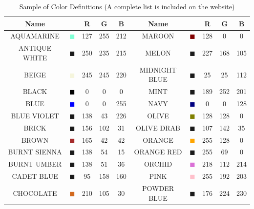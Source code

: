 \documentclass[11pt]{book}
\begin{document}
\begin{table}[p]
\begin{center}
\caption{Sample of Color Definitions (A complete list is included on the website) }
\label{tab:colors}
\vspace{0.1in}
\begin{tabular}{|c|c|c|c|c|c||c|c|c|c|}
\hline
Name & &  R  & G & B & Name & & R & G & B   \\ \hline \hline
{\ct AQUAMARINE} & \textcolor{AQUAMARINE} {$\blacksquare$} & 127& 255& 212& {\ct MAROON} &  \textcolor{MAROON} {$\blacksquare$} & 128& 0& 0  \\ \hline
{\ct ANTIQUE WHITE} & \textcolor{ANTIQUE WHITE} {$\blacksquare$} & 250& 235& 215& {\ct MELON} &  \textcolor{MELON} {$\blacksquare$} & 227& 168& 105  \\ \hline
{\ct BEIGE} & \textcolor{BEIGE} {$\blacksquare$} & 245& 245& 220& {\ct MIDNIGHT BLUE} &  \textcolor{MIDNIGHT BLUE} {$\blacksquare$} & 25& 25& 112  \\ \hline
{\ct BLACK} & \textcolor{BLACK} {$\blacksquare$} & 0& 0& 0& {\ct MINT} &  \textcolor{MINT} {$\blacksquare$} & 189& 252& 201  \\ \hline
{\ct BLUE} & \textcolor{BLUE} {$\blacksquare$} & 0& 0& 255& {\ct NAVY} &  \textcolor{NAVY} {$\blacksquare$} & 0& 0& 128  \\ \hline
{\ct BLUE VIOLET} & \textcolor{BLUE VIOLET} {$\blacksquare$} & 138& 43& 226& {\ct OLIVE} &  \textcolor{OLIVE} {$\blacksquare$} & 128& 128& 0  \\ \hline
{\ct BRICK} & \textcolor{BRICK} {$\blacksquare$} & 156& 102& 31& {\ct OLIVE DRAB} &  \textcolor{OLIVE DRAB} {$\blacksquare$} & 107& 142& 35  \\ \hline
{\ct BROWN} & \textcolor{BROWN} {$\blacksquare$} & 165& 42& 42& {\ct ORANGE} &  \textcolor{ORANGE} {$\blacksquare$} & 255& 128& 0  \\ \hline
{\ct BURNT SIENNA} & \textcolor{BURNT SIENNA} {$\blacksquare$} & 138& 54& 15& {\ct ORANGE RED} &  \textcolor{ORANGE RED} {$\blacksquare$} & 255& 69& 0  \\ \hline
{\ct BURNT UMBER} & \textcolor{BURNT UMBER} {$\blacksquare$} & 138& 51& 36& {\ct ORCHID} &  \textcolor{ORCHID} {$\blacksquare$} & 218& 112& 214  \\ \hline
{\ct CADET BLUE} & \textcolor{CADET BLUE} {$\blacksquare$} & 95& 158& 160& {\ct PINK} &  \textcolor{PINK} {$\blacksquare$} & 255& 192& 203  \\ \hline
{\ct CHOCOLATE} & \textcolor{CHOCOLATE} {$\blacksquare$} & 210& 105& 30& {\ct POWDER BLUE} &  \textcolor{POWDER BLUE} {$\blacksquare$} & 176& 224& 230  \\ \hline

\end{tabular}
\end{center}
\end{table}
\end{document}
